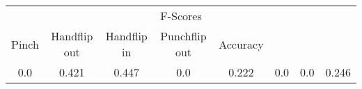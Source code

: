 \documentclass{standalone}
\begin{document}
 
 \begin{tabular}{|c|c|c|c|c|c|c ||c|}
\cline{1-8}\multicolumn{8}{|c|}{F-Scores} \\ 
\cline{1-8}Pinch & Handflip out & Handflip in & Punchflip out & Accuracy\\ 
\cline{1-8}0.0 & 0.421 & 0.447 & 0.0 & 0.222 & 0.0 & 0.0 & 0.246\\ 
 \cline{1-8}\hline \end{tabular}
 
\end{document}
